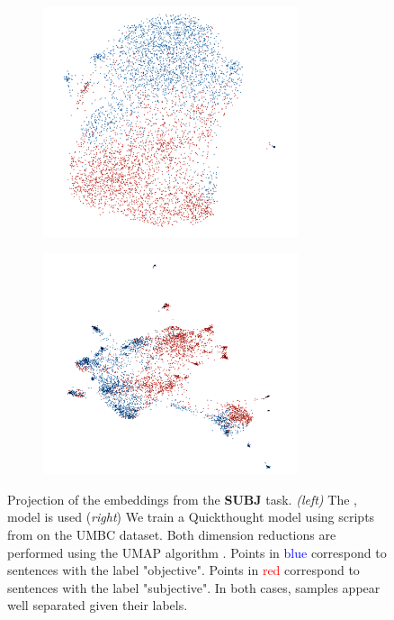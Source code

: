 \begin{figure}[htb!]
\centering
\begin{subfigure}[b]{8cm}
    \centering
    \includegraphics[width=7.5cm]{images/SUBJ_MV_DEP_CONST_no_sphere.png}
    \label{fig:sub1}
\end{subfigure}
\hfill
\begin{subfigure}[b]{8cm}  
    \centering 
    \includegraphics[width=7.5cm]{images/SUBJ_QT_no_sphere.png}
    \label{fig:sub2}
\end{subfigure}
\caption{Projection of the embeddings from the \textbf{SUBJ} task. \textit{(left)} The \dep, \const model is used (\textit{right}) We train a Quickthought model using scripts from \parencite{logeswaran_18} on the UMBC dataset. Both dimension reductions are performed using the UMAP algorithm \parencite{mcinnes_18}. Points in \textcolor{blue}{blue} correspond to sentences with the label "objective". Points in \textcolor{red}{red} correspond to sentences with the label "subjective". In both cases, samples appear well separated given their labels.}
\end{figure}

